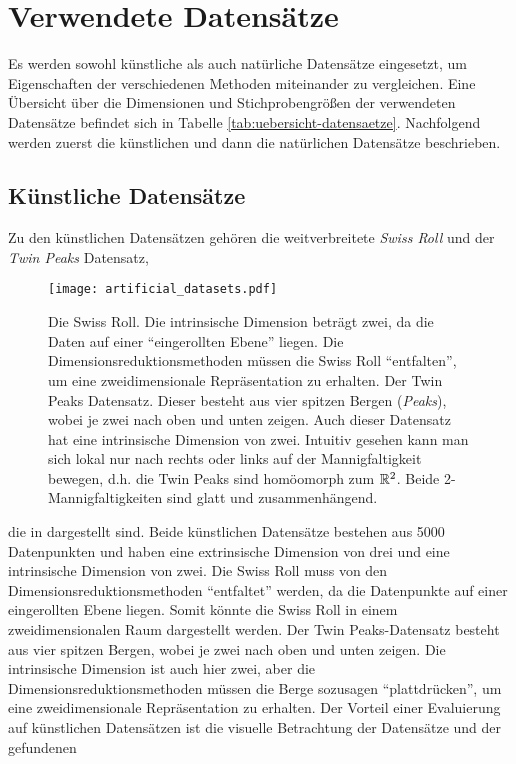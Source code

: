 \section{Verwendete Datensätze}
\label{ch:Vergleich:sec:VerwendeteDatensaetze}
Es werden sowohl künstliche als auch natürliche Datensätze eingesetzt, um Eigenschaften der
verschiedenen Methoden miteinander zu vergleichen. Eine Übersicht über die Dimensionen und Stichprobengrößen der verwendeten Datensätze befindet sich in Tabelle \ref{tab:uebersicht-datensaetze}. Nachfolgend werden zuerst die künstlichen und dann die natürlichen Datensätze beschrieben.

\subsection{Künstliche Datensätze}
\label{ch:Vergleich:sec:VerwendeteDatensaetze:kuenstlich}
Zu den künstlichen Datensätzen gehören die weitverbreitete \textit{Swiss Roll} und der \textit{Twin Peaks} Datensatz,
\begin{figure}[ht]
	\begin{center}
		\texttt{[image: artificial\_datasets.pdf]}
	\end{center}
	\caption[Künstliche Datensätze]{\figleft Die Swiss Roll. Die intrinsische Dimension beträgt zwei, da die Daten auf einer \enquote{eingerollten Ebene} liegen. Die Dimensionsreduktionsmethoden müssen die Swiss Roll \enquote{entfalten}, um eine zweidimensionale Repräsentation zu erhalten. \figright Der Twin Peaks Datensatz. Dieser besteht aus vier spitzen Bergen (\textit{Peaks}), wobei je zwei nach oben und unten zeigen. Auch dieser Datensatz hat eine intrinsische Dimension von zwei. Intuitiv gesehen kann man sich lokal nur nach rechts oder links auf der Mannigfaltigkeit bewegen, d.h. die Twin Peaks sind homöomorph zum $\mathbb{R}^2$. Beide 2-Mannigfaltigkeiten sind glatt und zusammenhängend.}
	\label{fig:ArtificialDatasets}
\end{figure}
die in  dargestellt sind.
Beide künstlichen Datensätze bestehen aus \num{5000} Datenpunkten und haben eine extrinsische Dimension von drei und eine intrinsische
Dimension von zwei. Die Swiss Roll muss von den Dimensionsreduktionsmethoden \enquote{entfaltet} werden, da die Datenpunkte auf einer eingerollten Ebene liegen. Somit könnte die Swiss Roll in einem zweidimensionalen Raum dargestellt werden. Der Twin Peaks-Datensatz besteht aus vier spitzen Bergen, wobei je zwei nach oben und unten zeigen. Die intrinsische Dimension ist auch hier zwei, aber die Dimensionsreduktionsmethoden müssen die Berge sozusagen \enquote{plattdrücken}, um eine zweidimensionale Repräsentation zu erhalten. Der Vorteil einer Evaluierung auf künstlichen Datensätzen ist die visuelle Betrachtung der Datensätze und der gefundenen

